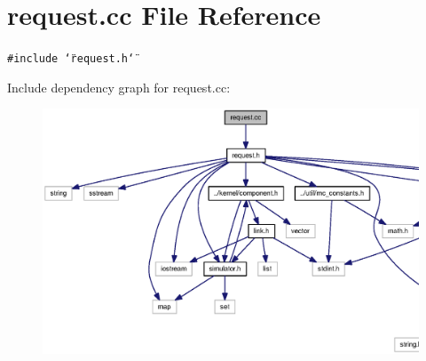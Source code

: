 \section{request.cc File Reference}
\label{request_8cc}
{\tt \#include \char`\"{}request.h\char`\"{}}\par


Include dependency graph for request.cc:\nopagebreak
\begin{figure}[H]
\begin{center}
\leavevmode
\includegraphics[width=420pt]{request_8cc__incl}
\end{center}
\end{figure}

